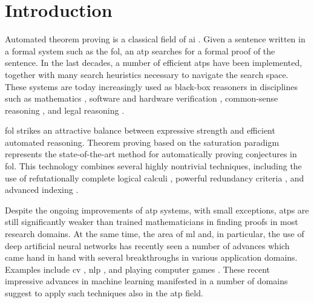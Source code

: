 \documentclass{article}
\begin{document}
\maketitle

\begin{abstract}

\end{abstract}

\section{Introduction}

Automated theorem proving is a classical field of \acrlong{ai} \cite{Russell2010}.
Given a sentence written in a formal system such as the \acrlong{fol},
an \gls{atp} searches for a formal proof of the sentence.
In the last decades, a number of efficient \glspl{atp} have been implemented,
together with many search heuristics necessary to navigate the search space.
These systems are today increasingly used as black-box reasoners in disciplines
such as mathematics \cite{DBLP:conf/birthday/KinyonVV13},
software and hardware verification \cite{Ahrendt2016,Hunt2017},
common-sense reasoning \cite{Pease2010},
and legal reasoning \cite{Passmore2017}.

\Gls{fol} strikes an attractive balance between expressive strength and efficient automated reasoning.
Theorem proving based on the saturation paradigm \cite{DBLP:books/el/RV01/BachmairG01}
represents the state-of-the-art method for automatically proving conjectures in \gls{fol}.
This technology combines several highly nontrivial techniques,
including the use of refutationally complete logical calculi \cite{DBLP:books/el/RV01/NieuwenhuisR01},
powerful redundancy criteria \cite{DBLP:books/el/RV01/BachmairG01},
and advanced indexing \cite{Voronkov1995}.

Despite the ongoing improvements of \gls{atp} systems, with small exceptions,
\glspl{atp} are still significantly weaker than trained mathematicians in finding proofs in most research domains.
At the same time, the area of \gls{ml} and, in particular, the use of deep artificial neural networks has recently seen a number of advances which came hand in hand with several breakthroughs in various application domains.
Examples include \acrlong{cv} \cite{CHAI2021100134},
\acrlong{nlp} \cite{8949185}, and
playing computer games \cite{shao2019survey}.
These recent impressive advances in machine learning manifested in a number of domains suggest to apply such techniques also in the \gls{atp} field.
\end{document}
